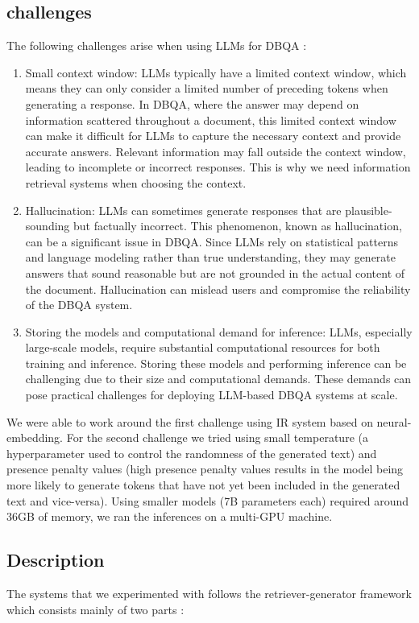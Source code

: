 \documentclass[a4paper,12pt]{article}
\begin{document}
\subsection{challenges}
The following challenges arise when using LLMs for DBQA : 
\begin{enumerate}
	\item Small context window: LLMs typically have a limited context window, which means they can only consider a limited number of preceding tokens when generating a response. In DBQA, where the answer may depend on information scattered throughout a document, this limited context window can make it difficult for LLMs to capture the necessary context and provide accurate answers. Relevant information may fall outside the context window, leading to incomplete or incorrect responses. 
    This is why we need information retrieval systems when choosing the context.
	\item Hallucination: LLMs can sometimes generate responses that are plausible-sounding but factually incorrect. 
    This phenomenon, known as hallucination, can be a significant issue in DBQA. Since LLMs rely on statistical patterns and language modeling rather than true understanding, they may generate answers that sound reasonable but are not grounded in the actual content of the document. Hallucination can mislead users and compromise the reliability of the DBQA system.
	\item Storing the models and computational demand for inference: LLMs, especially large-scale models, require substantial computational resources for both training and inference. Storing these models and performing inference can be challenging due to their size and computational demands. These demands can pose practical challenges for deploying LLM-based DBQA systems at scale.
\end{enumerate}

We were able to work around the first challenge using IR system based on neural-embedding. 
For the second challenge we tried using small temperature (a hyperparameter used to control the randomness of the generated text) and presence penalty values (high presence penalty values results in the model being more likely to 
generate tokens that have not yet been included in the generated text and vice-versa).
Using smaller models (7B parameters each) required around 36GB of memory, we ran the inferences on a multi-GPU machine.

\subsection{Description}
The systems that we experimented with follows the retriever-generator framework which consists mainly of two parts : 
\end{document}
